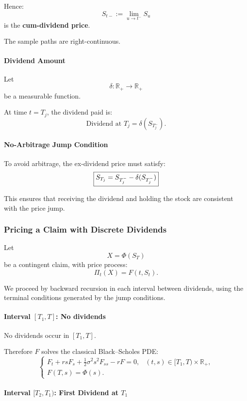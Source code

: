 \documentclass[12pt,a4paper]{article}
\theoremstyle{definition}
\newcommand{\R}{\mathbb{R}}
\begin{document}
Hence:
\[
S_{t-} := \lim_{u \to t^-} S_u
\]
is the \textbf{cum-dividend price}.

The sample paths are right-continuous.

\paragraph{Dividend Amount}

Let
\[
\delta : \R_+ \to \R_+
\]
be a measurable function.

At time $t = T_j$, the dividend paid is:
\[
\text{Dividend at } T_j = \delta(S_{T_j^-}).
\]

\paragraph{No-Arbitrage Jump Condition}

To avoid arbitrage, the ex-dividend price must satisfy:
\[
\fbox{$S_{T_j} = S_{T_j^-} - \delta(S_{T_j^-})$}
\]

This ensures that receiving the dividend and holding the stock are consistent with the price jump.

\subsubsection{Pricing a Claim with Discrete Dividends}

Let
\[
X = \Phi(S_T)
\]
be a contingent claim, with price process:
\[
\Pi_t(X) = F(t, S_t).
\]

We proceed by backward recursion in each interval between dividends, using the terminal conditions generated by the jump conditions.

\paragraph{Interval $[T_1, T]$: No dividends}

No dividends occur in $[T_1, T]$.

Therefore $F$ solves the classical Black--Scholes PDE:
\[
\begin{cases}
F_t + r s F_s + \frac{1}{2} \sigma^2 s^2 F_{ss} - r F = 0, & (t, s) \in [T_1, T) \times \R_+, \\
F(T, s) = \Phi(s).
\end{cases}
\]

\paragraph{Interval $[T_2, T_1)$: First Dividend at $T_1$}
\end{document}
